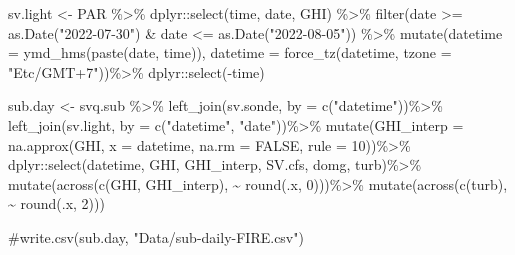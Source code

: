 \documentclass[
  letterpaper,
  DIV=11,
  numbers=noendperiod]{scrartcl}
\newenvironment{Shaded}{\begin{snugshade}}{\end{snugshade}}
\newcommand{\AttributeTok}[1]{\textcolor[rgb]{0.40,0.45,0.13}{#1}}
\newcommand{\CommentTok}[1]{\textcolor[rgb]{0.37,0.37,0.37}{#1}}
\newcommand{\ConstantTok}[1]{\textcolor[rgb]{0.56,0.35,0.01}{#1}}
\newcommand{\DecValTok}[1]{\textcolor[rgb]{0.68,0.00,0.00}{#1}}
\newcommand{\FunctionTok}[1]{\textcolor[rgb]{0.28,0.35,0.67}{#1}}
\newcommand{\NormalTok}[1]{\textcolor[rgb]{0.00,0.23,0.31}{#1}}
\newcommand{\OtherTok}[1]{\textcolor[rgb]{0.00,0.23,0.31}{#1}}
\newcommand{\SpecialCharTok}[1]{\textcolor[rgb]{0.37,0.37,0.37}{#1}}
\newcommand{\StringTok}[1]{\textcolor[rgb]{0.13,0.47,0.30}{#1}}
\begin{document}
\begin{Shaded}
\begin{Highlighting}[]
\NormalTok{sv.light }\OtherTok{\textless{}{-}}\NormalTok{ PAR }\SpecialCharTok{\%\textgreater{}\%}
\NormalTok{  dplyr}\SpecialCharTok{::}\FunctionTok{select}\NormalTok{(time, date, GHI) }\SpecialCharTok{\%\textgreater{}\%}
  \FunctionTok{filter}\NormalTok{(date }\SpecialCharTok{\textgreater{}=} \FunctionTok{as.Date}\NormalTok{(}\StringTok{"2022{-}07{-}30"}\NormalTok{) }\SpecialCharTok{\&}\NormalTok{ date }\SpecialCharTok{\textless{}=} \FunctionTok{as.Date}\NormalTok{(}\StringTok{"2022{-}08{-}05"}\NormalTok{)) }\SpecialCharTok{\%\textgreater{}\%}
  \FunctionTok{mutate}\NormalTok{(}\AttributeTok{datetime =} \FunctionTok{ymd\_hms}\NormalTok{(}\FunctionTok{paste}\NormalTok{(date, time)),}
    \AttributeTok{datetime =} \FunctionTok{force\_tz}\NormalTok{(datetime, }\AttributeTok{tzone =} \StringTok{"Etc/GMT+7"}\NormalTok{))}\SpecialCharTok{\%\textgreater{}\%}
\NormalTok{  dplyr}\SpecialCharTok{::}\FunctionTok{select}\NormalTok{(}\SpecialCharTok{{-}}\NormalTok{time)}
  
\NormalTok{sub.day }\OtherTok{\textless{}{-}}\NormalTok{ svq.sub }\SpecialCharTok{\%\textgreater{}\%} 
  \FunctionTok{left\_join}\NormalTok{(sv.sonde, }\AttributeTok{by =} \FunctionTok{c}\NormalTok{(}\StringTok{"datetime"}\NormalTok{))}\SpecialCharTok{\%\textgreater{}\%}
  \FunctionTok{left\_join}\NormalTok{(sv.light, }\AttributeTok{by =} \FunctionTok{c}\NormalTok{(}\StringTok{"datetime"}\NormalTok{, }\StringTok{"date"}\NormalTok{))}\SpecialCharTok{\%\textgreater{}\%}
  \FunctionTok{mutate}\NormalTok{(}\AttributeTok{GHI\_interp =} \FunctionTok{na.approx}\NormalTok{(GHI, }\AttributeTok{x =}\NormalTok{ datetime, }\AttributeTok{na.rm =} \ConstantTok{FALSE}\NormalTok{, }\AttributeTok{rule =} \DecValTok{10}\NormalTok{))}\SpecialCharTok{\%\textgreater{}\%}
\NormalTok{  dplyr}\SpecialCharTok{::}\FunctionTok{select}\NormalTok{(datetime, GHI, GHI\_interp, SV.cfs, domg, turb)}\SpecialCharTok{\%\textgreater{}\%}
   \FunctionTok{mutate}\NormalTok{(}\FunctionTok{across}\NormalTok{(}\FunctionTok{c}\NormalTok{(GHI, GHI\_interp), }\SpecialCharTok{\textasciitilde{}} \FunctionTok{round}\NormalTok{(.x, }\DecValTok{0}\NormalTok{)))}\SpecialCharTok{\%\textgreater{}\%}
  \FunctionTok{mutate}\NormalTok{(}\FunctionTok{across}\NormalTok{(}\FunctionTok{c}\NormalTok{(turb), }\SpecialCharTok{\textasciitilde{}} \FunctionTok{round}\NormalTok{(.x, }\DecValTok{2}\NormalTok{)))}

\CommentTok{\#write.csv(sub.day, "Data/sub{-}daily{-}FIRE.csv")}
\end{Highlighting}
\end{Shaded}
\end{document}
